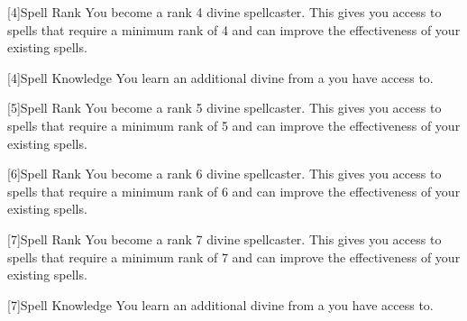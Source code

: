         [4]{Spell Rank} You become a rank 4 divine spellcaster.
        This gives you access to spells that require a minimum rank of 4 and can improve the effectiveness of your existing spells.

        [4]{Spell Knowledge} You learn an additional divine  from a  you have access to.

        [5]{Spell Rank} You become a rank 5 divine spellcaster.
        This gives you access to spells that require a minimum rank of 5 and can improve the effectiveness of your existing spells.

        [6]{Spell Rank} You become a rank 6 divine spellcaster.
        This gives you access to spells that require a minimum rank of 6 and can improve the effectiveness of your existing spells.

        [7]{Spell Rank} You become a rank 7 divine spellcaster.
        This gives you access to spells that require a minimum rank of 7 and can improve the effectiveness of your existing spells.

        [7]{Spell Knowledge} You learn an additional divine  from a  you have access to.

